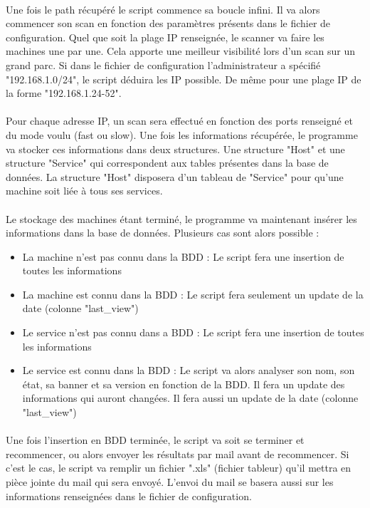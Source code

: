 \documentclass[12pt]{report}
\begin{document}
		\paragraph{}
			Une fois le path récupéré le script commence sa boucle infini. Il va alors commencer son scan en fonction des paramètres présents dans le fichier de configuration. Quel que soit la plage IP renseignée, le scanner va faire les machines une par une. Cela apporte une meilleur visibilité lors d'un scan sur un grand parc. Si dans le fichier de configuration l'administrateur a spécifié "192.168.1.0/24", le script déduira les IP possible. De même pour une plage IP de la forme "192.168.1.24-52".
		\paragraph{}
			Pour chaque adresse IP, un scan sera effectué en fonction des ports renseigné et du mode voulu (fast ou slow). Une fois les informations récupérée, le programme va stocker ces informations dans deux structures. Une structure "Host" et une structure "Service" qui correspondent aux tables présentes dans la base de données. La structure "Host" disposera d'un tableau de "Service" pour qu'une machine soit liée à tous ses services.
		\paragraph{}
			Le stockage des machines étant terminé, le programme va maintenant insérer les informations dans la base de données. Plusieurs cas sont alors possible :
			\begin{itemize}
				\item La machine n'est pas connu dans la BDD : Le script fera une insertion de toutes les informations
				\item La machine est connu dans la BDD : Le script fera seulement un update de la date (colonne "last\_view")
				\item Le service n'est pas connu dans a BDD : Le script fera une insertion de toutes les informations
				\item Le service est connu dans la BDD : Le script va alors analyser son nom, son état, sa banner et sa version en fonction de la BDD. Il fera un update des informations qui auront changées. Il fera aussi un update de la date (colonne "last\_view")
			\end{itemize}
		\paragraph{}
			Une fois l'insertion en BDD terminée, le script va soit se terminer et recommencer, ou alors envoyer les résultats par mail avant de recommencer. Si c'est le cas, le script va remplir un fichier ".xls" (fichier tableur) qu'il mettra en pièce jointe du mail qui sera envoyé. L'envoi du mail se basera aussi sur les informations renseignées dans le fichier de configuration.
\end{document}
